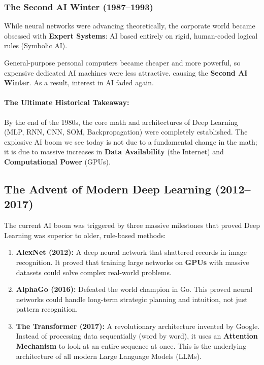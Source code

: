 \documentclass[11pt]{article}
\theoremstyle{smallexample}
\begin{document}
\subsubsection{The Second AI Winter (1987--1993)}
While neural networks were advancing theoretically, the corporate world became obsessed with \textbf{Expert Systems}: AI based entirely on rigid, human-coded logical rules (Symbolic AI). 

 General-purpose personal computers became cheaper and more powerful, so expensive dedicated AI machines were less attractive. causing the \textbf{Second AI Winter}. As a result, interest in AI faded again.


        \paragraph*{The Ultimate Historical Takeaway:}
        By the end of the 1980s, the core math and architectures of Deep Learning (MLP, RNN, CNN, SOM, Backpropagation) were completely established. The explosive AI boom we see today is not due to a fundamental change in the math; it is due to massive increases in \textbf{Data Availability} (the Internet) and \textbf{Computational Power} (GPUs).


\subsection{The Advent of Modern Deep Learning (2012--2017)}
The current AI boom was triggered by three massive milestones that proved Deep Learning was superior to older, rule-based methods:

\begin{enumerate}
    \item \textbf{AlexNet (2012):} A deep neural network that shattered records in image recognition. It proved that training large networks on \textbf{GPUs} with massive datasets could solve complex real-world problems.
    \item \textbf{AlphaGo (2016):} Defeated the world champion in Go. This proved neural networks could handle long-term strategic planning and intuition, not just pattern recognition.
    \item \textbf{The Transformer (2017):} A revolutionary architecture invented by Google. Instead of processing data sequentially (word by word), it uses an \textbf{Attention Mechanism} to look at an entire sequence at once. This is the underlying architecture of all modern Large Language Models (LLMs).
\end{enumerate}
\end{document}
